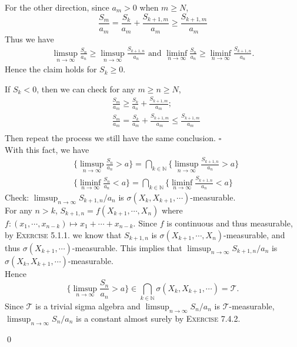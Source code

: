 \begin{answer}
\begin{equation*}
\end{equation*}
For the other direction, since $a_m > 0$ when $m\geq N$,
\begin{equation*}
    \frac{S_m}{a_m}=\frac{S_k}{a_m}+\frac{S_{k+1,m}}{a_m}\geq\frac{S_{k+1,m}}{a_m}
\end{equation*}
Thus we have
\begin{equation*}
    \begin{aligned}
        \limsup_{n\rightarrow\infty}\frac{S_n}{a_n}\geq\limsup_{n\rightarrow\infty}\frac{S_{k+1,n}}{a_n}\text{ and }\liminf_{n\rightarrow\infty}\frac{S_n}{a_n}\geq\liminf_{n\rightarrow\infty}\frac{S_{k+1,n}}{a_n}.
    \end{aligned}
\end{equation*}
Hence the claim holds for $S_k\geq 0$.

If $S_{k}<0$, then we can check for any $m\geq n\geq N$,
\begin{equation*}
    \begin{aligned}
        &\frac{S_m}{a_m}\geq\frac{S_{k}}{a_n}+\frac{S_{k+1,m}}{a_m};\\
        &\frac{S_m}{a_m}=\frac{S_{k}}{a_m}+\frac{S_{k+1,m}}{a_m}\leq\frac{S_{k+1,m}}{a_m}\\
    \end{aligned}
\end{equation*}
Then repeat the process we still have the same conclusion. $\square$
\\
With this fact, we have
\begin{equation*}
    \begin{aligned}
        &\Big\{\limsup_{n\rightarrow\infty}\frac{S_n}{a_n}>a\Big\}=\bigcap_{k\in\mathbb{N}}\Big\{\limsup_{n\rightarrow\infty}\frac{S_{k+1,n}}{a_n}>a\Big\}\\
        &\Big\{\liminf_{n\rightarrow\infty}\frac{S_n}{a_n}<a\Big\}=\bigcap_{k\in\mathbb{N}}\Big\{\liminf_{n\rightarrow\infty}\frac{S_{k+1,n}}{a_n}<a\Big\}
    \end{aligned}
\end{equation*}
Check: $\limsup_{n\rightarrow\infty}S_{k+1,n}/a_n$ is $\sigma(X_k,X_{k+1},\cdots)$-measurable.\\
For any $n> k$, $S_{k+1,n}=f(X_{k+1},\cdots,X_n)$ where $f:(x_1,\cdots,x_{n-k})\mapsto x_1+\cdots+x_{n-k}$. Since $f$ is continuous and thus measurable, by \textsc{Exercise 5.1.1.} we know that $S_{k+1,n}$ is $\sigma(X_{k+1},\cdots,X_n)$-measurable, and thus $\sigma(X_{k+1},\cdots)$-measurable. This implies that $\limsup_{n\rightarrow\infty}S_{k+1,n}/a_n$ is $\sigma(X_k,X_{k+1},\cdots)$-measurable.\\
Hence
\begin{equation*}
    \Big\{\limsup_{n\rightarrow\infty}\frac{S_n}{a_n}>a\Big\}\in\bigcap_{k\in\mathbb{N}}\sigma(X_k,X_{k+1},\cdots)=\mathcal{T}.
\end{equation*}
Since $\mathcal{T}$ is a trivial sigma algebra and $\limsup_{n\rightarrow\infty}S_n/a_n$ is $\mathcal{T}$-measurable, $\limsup_{n\rightarrow\infty}S_n/a_n$ is a constant almost surely by \textsc{Exercise 7.4.2}. 
\end{answer}\qquad \qed

